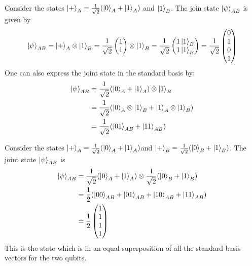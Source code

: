 \begin{example}
    Consider the states $\ket{+}_A = \frac{1}{\sqrt{2}}(\ket{0}_A+\ket{1}_A)$ and $\ket{1}_B$. The join state $\ket{\psi}_{AB}$ is given by
    \[
    \ket{\psi}_{AB}=\ket{+}_A\otimes \ket{1}_B  = \frac{1}{\sqrt{2}}\begin{pmatrix}1 \\ 1 \end{pmatrix} \otimes \ket{1}_B = \frac{1}{\sqrt{2}} \begin{pmatrix} 1 \ket{1}_B\\1\ket{1}_B \end{pmatrix} = \frac{1}{\sqrt{2}}\begin{pmatrix} 0 \\ 1 \\ 0 \\ 1 \end{pmatrix}
    \]
    One can also express the joint state in the standard basis by:
    \begin{align*}
    \ket{\psi}_{AB}&=\frac{1}{\sqrt{2}}(\ket{0}_A + \ket{1}_A )\otimes \ket{1}_B\\
    &=\frac{1}{\sqrt{2}}(\ket{0}_A \otimes \ket{1}_B+ \ket{1}_A \otimes \ket{1}_B )\\
    &=\frac{1}{\sqrt{2}}(\ket{01}_{AB}+\ket{11}_{AB})
    \end{align*}
\end{example}

\begin{example}
    Consider the states $\ket{+}_A=\frac{1}{\sqrt{2}}(\ket{0}_A+\ket{1}_A)$and $\ket{+}_B=\frac{1}{\sqrt{2}}(\ket{0}_B + \ket{1}_B)$. The joint state $\ket{\psi}_{AB}$ is
    \begin{align*}
    \ket{\psi}_{AB}&=\frac{1}{\sqrt{2}}(\ket{0}_A+\ket{1}_A)\otimes \frac{1}{\sqrt{2}} (\ket{0}_B+\ket{1}_B)\\
    &=\frac{1}{2}(\ket{00}_{AB}+\ket{01}_{AB}+\ket{10}_{AB}+\ket{11}_{AB})\\
    &=\frac{1}{2}\begin{pmatrix} 1 \\ 1 \\ 1 \\ 1 \end{pmatrix}
    \end{align*}
    This is the state which is in an equal superposition of all the standard basis vectors for the two qubits.
\end{example}

